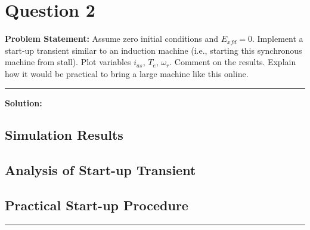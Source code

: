 \clearpage
\section*{Question 2}

\textbf{Problem Statement:} Assume zero initial conditions and $E_{xfd} = 0$. Implement a start-up transient similar to an induction machine (i.e., starting this synchronous machine from stall). Plot variables $i_{as}$, $T_e$, $\omega_r$. Comment on the results. Explain how it would be practical to bring a large machine like this online.

\vspace{1em}
\noindent\rule{\textwidth}{0.4pt}
\vspace{1em}

\textbf{Solution:}

\subsection*{Simulation Results}


\subsection*{Analysis of Start-up Transient}


\subsection*{Practical Start-up Procedure}


\vspace{1em}
\noindent\rule{\textwidth}{0.4pt}
